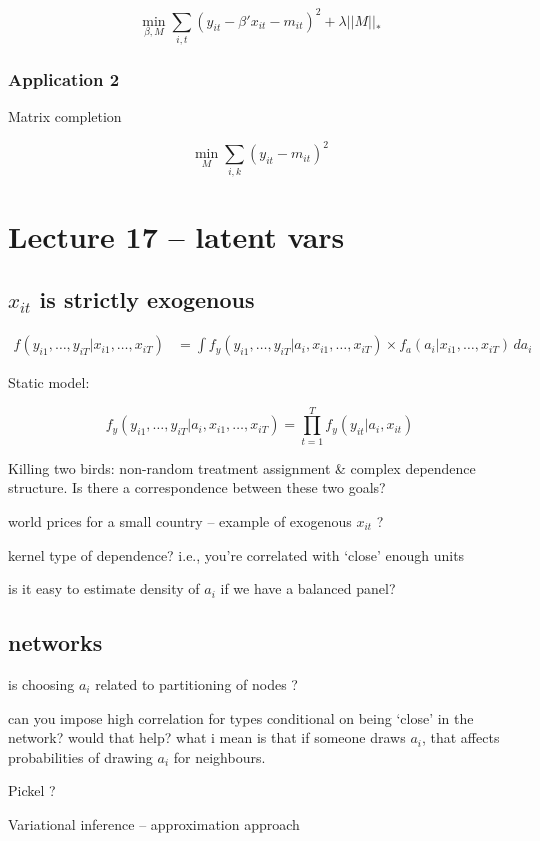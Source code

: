 \documentclass[a4paper,12pt,twoside]{article}
\begin{document}
\begin{equation}
  \min_{\beta, M} \sum_{i, t} \left( y_{it} - \beta' x_{it} - m_{it} \right)^2 + \lambda || M ||_{*}
\end{equation}

\subsubsection*{Application 2}

Matrix completion

\begin{equation}
  \min_{M} \sum_{i, k} \left( y_{it} - m_{it} \right)^2
\end{equation}


\section*{Lecture 17 -- latent vars}

\subsection*{$x_{it}$ is strictly exogenous}

\begin{equation}
\begin{split}
	f(y_{i1}, \dots, y_{iT} | x_{i1}, \dots, x_{iT}) & =
	\int f_y (y_{i1}, \dots, y_{iT} | a_i, x_{i1}, \dots, x_{iT}) \times f_a (a_i | x_{i1}, \dots, x_{iT}) \, d a_i
\end{split}
\end{equation}

Static model:

\begin{equation}
  f_y (y_{i1}, \dots, y_{iT} | a_i, x_{i1}, \dots, x_{iT}) = \prod_{t = 1}^T f_y (y_{it} | a_i, x_{it})
\end{equation}


Killing two birds: non-random treatment assignment \& complex dependence structure. Is there a correspondence between these two goals?

world prices for a small country -- example of exogenous $x_{it}$ ?

kernel type of dependence? i.e., you're correlated with `close' enough units

is it easy to estimate density of $a_i$ if we have a balanced panel?

\subsection*{networks}

is choosing $a_i$ related to partitioning of nodes ?

can you impose high correlation for types conditional on being `close' in the network? would that help? what i mean is that if someone draws $a_i$, that affects probabilities of drawing $a_i$ for neighbours.

Pickel ?


Variational inference -- approximation approach
\end{document}
